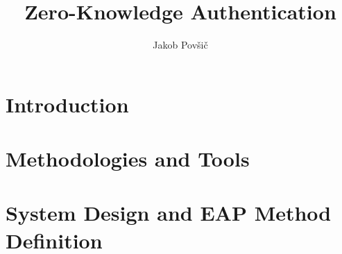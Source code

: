 \documentclass[12pt]{article}
\title{Zero-Knowledge Authentication}
\author{Jakob Povšič}
\theoremstyle{definition}
\begin{document}

\maketitle
\newpage

\tableofcontents
\newpage




\part{Introduction}
\label{chapter:1}


\part{Methodologies and Tools}
\label{chapter:2}







\part{System Design and EAP Method Definition}
\label{chapter:3}




%


\end{document}

